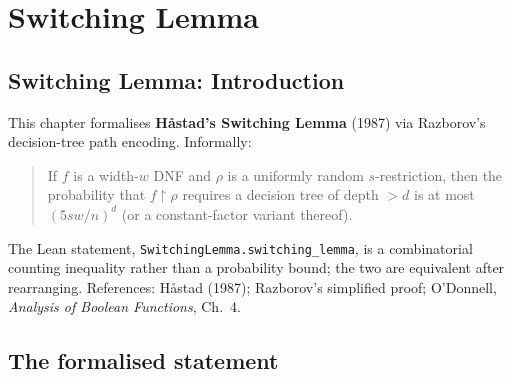 \section{Switching Lemma}
\subsection*{Switching Lemma: Introduction}

This chapter formalises \textbf{Håstad's Switching Lemma} (1987) via Razborov's
decision-tree path encoding. Informally:

\begin{quote}
If $f$ is a width-$w$ DNF and $\rho$ is a uniformly random $s$-restriction,
then the probability that $f\!\restriction\!\rho$ requires a decision tree of
depth $>d$ is at most $(5sw/n)^d$ (or a constant-factor variant thereof).
\end{quote}

The Lean statement, \texttt{SwitchingLemma.switching\_lemma}, is a combinatorial
counting inequality rather than a probability bound; the two are equivalent
after rearranging.  References: Håstad (1987); Razborov's simplified proof;
O'Donnell, \emph{Analysis of Boolean Functions}, Ch.~4.

\subsection{The formalised statement}

